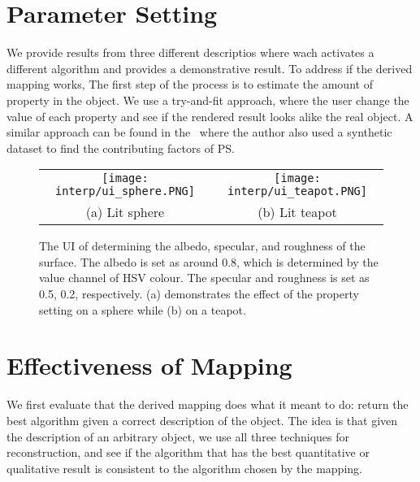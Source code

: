 
\section{Parameter Setting}
We provide results from three different descriptios where wach activates a different algorithm and provides a demonstrative result.
To address if the derived mapping works, The first step of the process is to estimate the amount of property in the object. We use a try-and-fit approach, where the user change the value of each property and see if the rendered result looks alike the real object. A similar approach can be found in the~\cite{Berkiten:2016:ARB} where the author also used a synthetic dataset to find the contributing factors of PS.
\begin{figure}[!htbp]
\centering
\begin{tabular}{cc}
  \texttt{[image: interp/ui\_sphere.PNG]}&
  \texttt{[image: interp/ui\_teapot.PNG]}\\
  (a) Lit sphere & (b) Lit teapot\\
\end{tabular}
\caption{The UI of determining the albedo, specular, and roughness of the surface. The albedo is set as around 0.8, which is determined by the value channel of HSV colour. The specular and roughness is set as 0.5, 0.2, respectively. (a) demonstrates the effect of the property setting on a sphere while (b) on a teapot.}
\label{fig:ui}
\end{figure}

\section{Effectiveness of Mapping}
We first evaluate that the derived mapping does what it meant to do: return the best algorithm given a correct description of the object. The idea is that given the description of an arbitrary object, we use all three techniques for reconstruction, and see if the algorithm that has the best quantitative or qualitative result is consistent to the algorithm chosen by the mapping.

